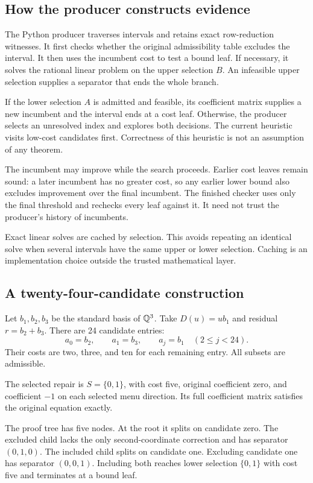 \subsection{How the producer constructs evidence}

The Python producer traverses intervals and retains exact row-reduction witnesses. It first checks whether the original admissibility table excludes the interval. It then uses the incumbent cost to test a bound leaf. If necessary, it solves the rational linear problem on the upper selection $B$. An infeasible upper selection supplies a separator that ends the whole branch.

If the lower selection $A$ is admitted and feasible, its coefficient matrix supplies a new incumbent and the interval ends at a cost leaf. Otherwise, the producer selects an unresolved index and explores both decisions. The current heuristic visits low-cost candidates first. Correctness of this heuristic is not an assumption of any theorem.

The incumbent may improve while the search proceeds. Earlier cost leaves remain sound: a later incumbent has no greater cost, so any earlier lower bound also excludes improvement over the final incumbent. The finished checker uses only the final threshold and rechecks every leaf against it. It need not trust the producer's history of incumbents.

Exact linear solves are cached by selection. This avoids repeating an identical solve when several intervals have the same upper or lower selection. Caching is an implementation choice outside the trusted mathematical layer.

\subsection{A twenty-four-candidate construction}

Let $b_1,b_2,b_3$ be the standard basis of $\mathbb{Q}^3$. Take $D(u)=ub_1$ and residual $r=b_2+b_3$. There are 24 candidate entries:
\[
 a_0=b_2,\qquad a_1=b_3,\qquad a_j=b_1\quad(2\leq j<24).
\]
Their costs are two, three, and ten for each remaining entry. All subsets are admissible.

The selected repair is $S=\{0,1\}$, with cost five, original coefficient zero, and coefficient $-1$ on each selected menu direction. Its full coefficient matrix satisfies the original equation exactly.

The proof tree has five nodes. At the root it splits on candidate zero. The excluded child lacks the only second-coordinate correction and has separator $(0,1,0)$. The included child splits on candidate one. Excluding candidate one has separator $(0,0,1)$. Including both reaches lower selection $\{0,1\}$ with cost five and terminates at a bound leaf.

